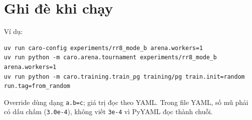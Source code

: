 \section{Ghi đè khi chạy}
Ví dụ:
\begin{lstlisting}[numbers=none]
uv run caro-config experiments/rr8_mode_b arena.workers=1
uv run python -m caro.arena.tournament experiments/rr8_mode_b arena.workers=1
uv run python -m caro.training.train_pg training/pg train.init=random run.tag=from_random
\end{lstlisting}
Override dùng dạng \texttt{a.b=c}; giá trị đọc theo YAML. Trong file YAML, số mũ phải có dấu
chấm (\texttt{3.0e-4}), không viết \texttt{3e-4} vì PyYAML đọc thành chuỗi.